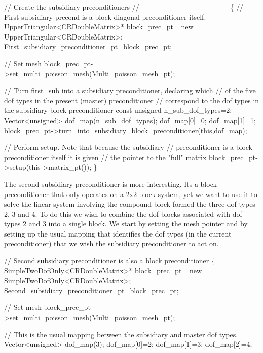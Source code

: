 \begin{DoxyCodeInclude}
  \textcolor{comment}{// Create the subsidiary preconditioners}
  \textcolor{comment}{//--------------------------------------}
  \{
   \textcolor{comment}{// First subsidiary precond is a block diagonal preconditioner itself.}
   UpperTriangular<CRDoubleMatrix>* block\_prec\_pt=
    \textcolor{keyword}{new} UpperTriangular<CRDoubleMatrix>;
   First\_subsidiary\_preconditioner\_pt=block\_prec\_pt;

   \textcolor{comment}{// Set mesh}
   block\_prec\_pt->set\_multi\_poisson\_mesh(Multi\_poisson\_mesh\_pt);
   
   \textcolor{comment}{// Turn first\_sub into a subsidiary preconditioner, declaring which}
   \textcolor{comment}{// of the five dof types in the present (master) preconditioner}
   \textcolor{comment}{// correspond to the dof types in the subsidiary block preconditioner}
   \textcolor{keyword}{const} \textcolor{keywordtype}{unsigned} n\_sub\_dof\_types=2;
   Vector<unsigned> dof\_map(n\_sub\_dof\_types);
   dof\_map[0]=0;
   dof\_map[1]=1;
   block\_prec\_pt->turn\_into\_subsidiary\_block\_preconditioner(\textcolor{keyword}{this},dof\_map);    

   \textcolor{comment}{// Perform setup. Note that because the subsidiary}
   \textcolor{comment}{// preconditioner is a block preconditioner itself it is given}
   \textcolor{comment}{// the pointer to the "full" matrix}
   block\_prec\_pt->setup(this->matrix\_pt());
  \}

\end{DoxyCodeInclude}


The second subsidiary preconditioner is more interesting. It\textquotesingle{}s a block preconditioner that only operates on a 2x2 block system, yet we want to use it to solve the linear system involving the compound block formed the three dof types 2, 3 and 4. To do this we wish to combine the dof blocks associated with dof types 2 and 3 into a single block. We start by setting the mesh pointer and by setting up the usual mapping that identifies the dof types (in the current preconditioner) that we wish the subsidiary preconditioner to act on.


\begin{DoxyCodeInclude}
  \textcolor{comment}{// Second subsidiary preconditioner is also a block preconditioner }
  \{
   SimpleTwoDofOnly<CRDoubleMatrix>* block\_prec\_pt=
    \textcolor{keyword}{new} SimpleTwoDofOnly<CRDoubleMatrix>;
   Second\_subsidiary\_preconditioner\_pt=block\_prec\_pt;
   
   \textcolor{comment}{// Set mesh}
   block\_prec\_pt->set\_multi\_poisson\_mesh(Multi\_poisson\_mesh\_pt);
   
   \textcolor{comment}{// This is the usual mapping between the subsidiary and master dof types.}
   Vector<unsigned> dof\_map(3);
   dof\_map[0]=2;
   dof\_map[1]=3;
   dof\_map[2]=4;

\end{DoxyCodeInclude}



